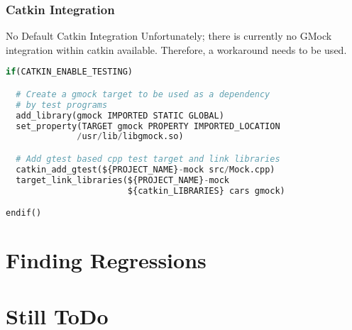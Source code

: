 \documentclass{beamer}
\begin{document}
\begin{frame}[fragile]
  \frametitle{Catkin Integration}
  \begin{block}{No Default Catkin Integration}
    Unfortunately; there is currently no GMock integration within catkin available. Therefore, a workaround needs to be used.
  \end{block}

  \begin{lstlisting}[title=GMock Catkin Integration Workaround, style=code, language=python, basicstyle=\ttfamily\footnotesize\color{white}]
if(CATKIN_ENABLE_TESTING)

  # Create a gmock target to be used as a dependency
  # by test programs
  add_library(gmock IMPORTED STATIC GLOBAL)
  set_property(TARGET gmock PROPERTY IMPORTED_LOCATION
              /usr/lib/libgmock.so)

  # Add gtest based cpp test target and link libraries
  catkin_add_gtest(${PROJECT_NAME}-mock src/Mock.cpp)
  target_link_libraries(${PROJECT_NAME}-mock 
                        ${catkin_LIBRARIES} cars gmock)

endif()
  \end{lstlisting}
\end{frame}

\section{Finding Regressions}



\section{Still ToDo}

\end{document}
